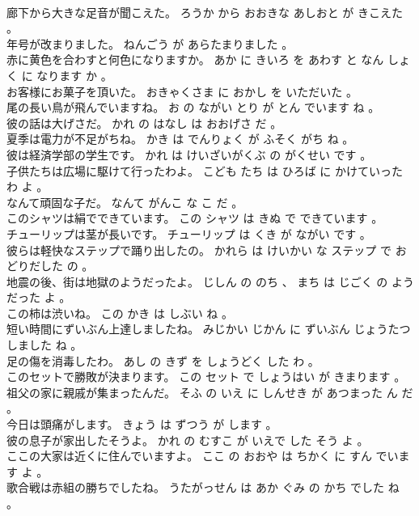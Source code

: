 \documentclass[8pt]{extreport}
\begin{document}
\begin{CJK}{UTF8}{min}
\\	廊下から大きな足音が聞こえた。	ろうか から おおきな あしおと が きこえた 。 
\\	年号が改まりました。	ねんごう が あらたまりました 。 
\\	赤に黄色を合わすと何色になりますか。	あか に きいろ を あわす と なん しょく に なります か 。 
\\	お客様にお菓子を頂いた。	おきゃくさま に おかし を いただいた 。 
\\	尾の長い鳥が飛んでいますね。	お の ながい とり が とん でいます ね 。 
\\	彼の話は大げさだ。	かれ の はなし は おおげさ だ 。 
\\	夏季は電力が不足がちね。	かき は でんりょく が ふそく がち ね 。 
\\	彼は経済学部の学生です。	かれ は けいざいがくぶ の がくせい です 。 
\\	子供たちは広場に駆けて行ったわよ。	こども たち は ひろば に かけていった わ よ 。 
\\	なんて頑固な子だ。	なんて がんこ な こ だ 。 
\\	このシャツは絹でできています。	この シャツ は きぬ で できています 。 
\\	チューリップは茎が長いです。	チューリップ は くき が ながい です 。 
\\	彼らは軽快なステップで踊り出したの。	かれら は けいかい な ステップ で おどりだした の 。 
\\	地震の後、街は地獄のようだったよ。	じしん の のち 、 まち は じごく の よう だった よ 。 
\\	この柿は渋いね。	この かき は しぶい ね 。 
\\	短い時間にずいぶん上達しましたね。	みじかい じかん に ずいぶん じょうたつ しました ね 。 
\\	足の傷を消毒したわ。	あし の きず を しょうどく した わ 。 
\\	このセットで勝敗が決まります。	この セット で しょうはい が きまります 。 
\\	祖父の家に親戚が集まったんだ。	そふ の いえ に しんせき が あつまった ん だ 。 
\\	今日は頭痛がします。	きょう は ずつう が します 。 
\\	彼の息子が家出したそうよ。	かれ の むすこ が いえで した そう よ 。 
\\	ここの大家は近くに住んでいますよ。	ここ の おおや は ちかく に すん でいます よ 。 
\\	歌合戦は赤組の勝ちでしたね。	うたがっせん は あか ぐみ の かち でした ね 。 

\end{CJK}
\end{document}
